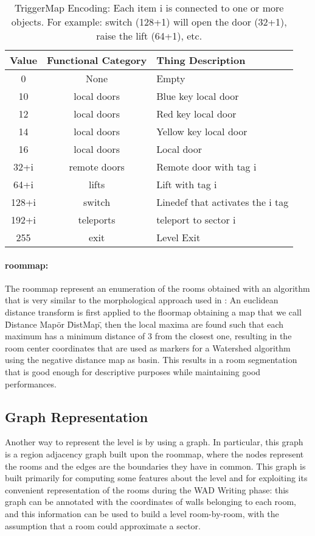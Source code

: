 \begin{table}
\begin{tabularx}{\textwidth}{| c | c | X | }
	\hline
	\textbf{Value} & \textbf{Functional Category} & \textbf{Thing Description} \\
	\hline
	0 &	None &	Empty \\
	10 &	local doors	 & Blue key local door \\
	12 &	local doors & Red key local door \\
	14 &	local doors	 & Yellow key local door \\
	16 &	local doors & Local door \\
	32+i &	remote doors &	Remote door with tag i \\
	64+i &	lifts &	Lift with tag i \\
	128+i &	switch &	Linedef that activates the i tag \\
	192+i &	teleports &	teleport to sector i \\
	255 &	exit &	Level Exit \\
	\hline
\end{tabularx}
\caption[TriggerMap Encoding]{TriggerMap Encoding: Each item i is connected to one or more objects. For example: switch (128+1) will open the door (32+1), raise the lift (64+1), etc.}
\label{tab:triggermap}
\end{table}

\paragraph{\gls{roommap}:} The \gls{roommap} represent an enumeration of the rooms obtained with an algorithm that is very similar to the morphological approach used in \cite{7487234}: An euclidean distance transform \cite{edt} is first applied to the \gls{floormap} obtaining a map that we call \"Distance Map\" or \"DistMap\", then the local maxima are found \cite{localmax} such that each maximum has a minimum distance of 3 from the closest one, resulting in the room center coordinates that are used as markers for a Watershed algorithm \cite{watershed} using the negative distance map as basin. This results in a room segmentation that is good enough for descriptive purposes while maintaining good performances.

\subsection{Graph Representation}
Another way to represent the level is by using a graph. In particular, this graph is a region adjacency graph \cite{Trémeau00regionsadjacency} built upon the \gls{roommap}, where the nodes represent the rooms and the edges are the boundaries they have in common. This graph is built primarily for computing some features about the level and for exploiting its convenient representation of the rooms during the WAD Writing phase: this graph can be annotated with the coordinates of walls belonging to each room, and this information can be used to build a level room-by-room, with the assumption that a room could approximate a sector.


